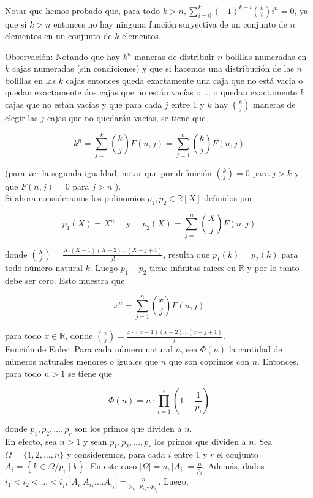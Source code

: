 \documentclass[10pt]{article}
\begin{document}
Notar que hemos probado que, para todo $k>n, \sum_{i=0}^{k}(-1)^{k-i}\binom{k}{i} i^{n}=0$, ya que si $k>n$ entonces no hay ninguna función suryectiva de un conjunto de $n$ elementos en un conjunto de $k$ elementos.

Observación: Notando que hay $k^{n}$ maneras de distribuir $n$ bolillas numeradas en $k$ cajas numeradas (sin condiciones) y que si hacemos una distribución de las $n$ bolillas en las $k$ cajas entonces queda exactamente una caja que no está vacía o quedan exactamente dos cajas que no están vacías o ... o quedan exactamente $k$ cajas que no están vacías y que para cada $j$ entre 1 y $k$ hay $\binom{k}{j}$ maneras de elegir las $j$ cajas que no quedarán vacías, se tiene que

$$
k^{n}=\sum_{j=1}^{k}\binom{k}{j} F(n, j)=\sum_{j=1}^{n}\binom{k}{j} F(n, j)
$$

(para ver la segunda igualdad, notar que por definición $\binom{k}{j}=0$ para $j>k$ y que $F(n, j)=0$ para $j>n$ ).\\
Si ahora consideramos los polinomios $p_{1}, p_{2} \in \mathbb{R}[X]$ definidos por

$$
p_{1}(X)=X^{n} \quad \text { y } \quad p_{2}(X)=\sum_{j=1}^{n}\binom{X}{j} F(n, j)
$$

donde $\binom{X}{j}=\frac{X .(X-1)(X-2) \ldots(X-j+1)}{j!}$, resulta que $p_{1}(k)=p_{2}(k)$ para todo número natural $k$. Luego $p_{1}-p_{2}$ tiene infinitas raíces en $\mathbb{R}$ y por lo tanto debe ser cero. Esto muestra que

$$
x^{n}=\sum_{j=1}^{n}\binom{x}{j} F(n, j)
$$

para todo $x \in \mathbb{R}$, donde $\binom{x}{j}=\frac{x \cdot(x-1)(x-2) \ldots(x-j+1)}{j!}$.\\
Función de Euler. Para cada número natural $n$, sea $\Phi(n)$ la cantidad de números naturales menores o iguales que $n$ que son coprimos con $n$. Entonces, para todo $n>1$ se tiene que

$$
\Phi(n)=n \cdot \prod_{i=1}^{r}\left(1-\frac{1}{p_{i}}\right)
$$

donde $p_{1}, p_{2}, \ldots, p_{r}$ son los primos que dividen a $n$.\\
En efecto, sea $n>1$ y sean $p_{1}, p_{2}, \ldots, p_{r}$ los primos que dividen a $n$. Sea $\Omega=\{1,2, \ldots, n\}$ y consideremos, para cada $i$ entre 1 y $r$ el conjunto $A_{i}=\left\{k \in \Omega / p_{i} \mid k\right\}$. En este caso $|\Omega|=n,\left|A_{i}\right|=\frac{n}{p_{i}}$. Además, dados $i_{1}<i_{2}<\ldots<i_{j},\left|A_{i_{1}} A_{i_{2}} \ldots . A_{i_{j}}\right|=\frac{n}{p_{i_{1}} \cdot p_{i_{2}} \ldots p_{i_{j}}}$. Luego,
\end{document}
